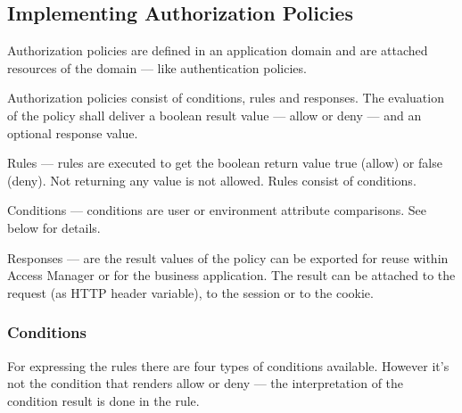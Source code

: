 \documentclass[11pt]{report}
\begin{document}
\subsection{Implementing Authorization Policies}

Authorization policies are defined in an application domain and are attached
resources of the domain --- like authentication policies.

Authorization policies consist of conditions, rules and responses.  The
evaluation of the policy shall deliver a boolean result value --- allow or deny
--- and an optional response value.


\begin{description}

    \item{Rules} --- rules are executed to get the boolean return value true
        (allow) or false (deny). Not returning any value is not allowed.  Rules
        consist of conditions.

    \item{Conditions} --- conditions are user or environment attribute
        comparisons.  See below for details.

    \item{Responses} --- are the result values of the policy can be exported
        for reuse within Access Manager or for the business application. The
        result can be attached to the request (as HTTP header variable), to the
        session or to the cookie.

\end{description}


\subsubsection{Conditions}

For expressing the rules there are four types of conditions available. However
it's not the condition that renders allow or deny --- the interpretation of the
condition result is done in the rule.
\end{document}
